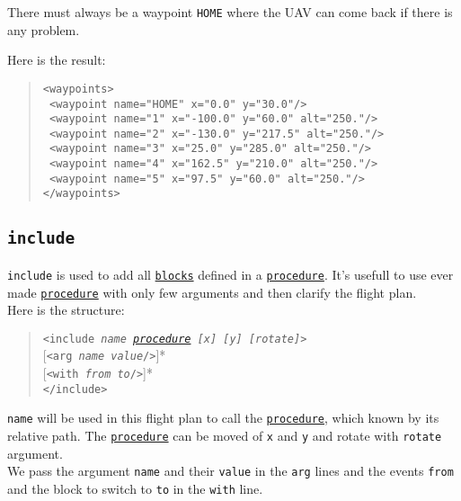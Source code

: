 \documentclass{article}
\renewcommand{\tt}[1]{\texttt{#1}}
\newcommand{\ex}[1]{\colorbox[gray]{0.92}{\tt{#1}}}
\newcommand{\hs}[1]{\hspace*{#1cm}}
\newcommand{\qt}[1]{\textcolor{gris75}{#1}}
\begin{document}
There must always be a waypoint \tt{HOME} where the UAV can come back if there is any problem.
\\


\begin{minipage}[ctb]{\textwidth}
Here is the result:
\begin{quote}
	\ex{<waypoints>} \\
	\ex{\hs{0.5} <waypoint name="\qt{HOME}" x="\qt{0.0}" y="\qt{30.0}"/>} \\
	\ex{\hs{0.5} <waypoint name="\qt{1}" x="\qt{-100.0}" y="\qt{60.0}"
	alt="\qt{250.}"/>} \\
	\ex{\hs{0.5} <waypoint name="\qt{2}" x="\qt{-130.0}" y="\qt{217.5}"
	alt="\qt{250.}"/>} \\
	\ex{\hs{0.5} <waypoint name="\qt{3}" x="\qt{25.0}" y="\qt{285.0}"
	alt="\qt{250.}"/>} \\
	\ex{\hs{0.5} <waypoint name="\qt{4}" x="\qt{162.5}" y="\qt{210.0}"
	alt="\qt{250.}"/>} \\
	\ex{\hs{0.5} <waypoint name="\qt{5}" x="\qt{97.5}" y="\qt{60.0}"
	alt="\qt{250.}"/>} \\
	\ex{</waypoints>}
\end{quote}
\end{minipage}
	

\hypertarget{include}{\subsection{\tt{include}}}
\label{include2}
\tt{include} is used to add all \hyperlink{blocks}{\tt{blocks}} defined in a
\hyperlink{procedures}{\tt{procedure}}. It's usefull to use ever made
\hyperlink{procedures}{\tt{procedure}} with only few arguments and then
clarify the flight plan. \\


Here is the structure:
\begin{quote}

	\tt{<include \emph{name \hyperlink{procedures}{procedure} [x] [y] [rotate]}>} \\
	\hs{0.5} [\tt{<arg \emph{name value}/>}]* \\
	\hs{0.5} [\tt{<with \emph{from to}/>}]* \\
	\tt{</include>}
\end{quote}

\tt{name} will be used in this flight plan to call the
\hyperlink{procedures}{\tt{procedure}}, which known by its relative path. The
\hyperlink{procedures}{\tt{procedure}} can be moved of \tt{x} and \tt{y}
and rotate with \tt{rotate} argument.\\
We pass the argument \tt{name} and their \tt{value} in the \tt{arg} lines and
the events \tt{from} and the block to switch to \tt{to} in the \tt{with}
line. \\
\end{document}
